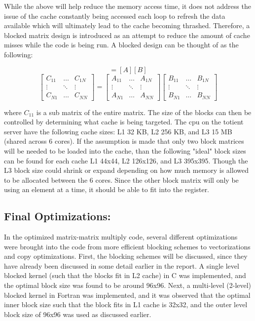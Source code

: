 \documentclass{article}
\begin{document}
While the above will help reduce the memory access time, it does not address the issue of the cache constantly being accessed each loop to refresh the data available which will ultimately lead to the cache becoming thrashed. Therefore, a blocked matrix design is introduced as an attempt to reduce the amount of cache misses while the code is being run. A blocked design can be thought of as the following:

\begin{equation*}
 [C] = [A][B]
 \end{equation*}
 \begin{equation*}
\begin{bmatrix}
C_{11} & \hdots & C_{1N} \\
\vdots & \ddots & \vdots \\
C_{N1} & \hdots & C_{NN}
\end{bmatrix} = \begin{bmatrix}
A_{11} & \hdots & A_{1N} \\
\vdots & \ddots & \vdots \\
A_{N1} & \hdots & A_{NN}
\end{bmatrix} \begin{bmatrix}
B_{11} & \hdots & B_{1N} \\
\vdots & \ddots & \vdots \\
B_{N1} & \hdots & B_{NN}
\end{bmatrix}
\end{equation*}

\noindent where $C_{11}$ is a sub matrix of the entire matrix. The size of the blocks can then be controlled by determining what cache is being targeted. The cpu on the totient server have the following cache sizes: L1 32 KB, L2 256 KB, and L3 15 MB (shared across 6 cores). If the assumption is made that only two block matrices will be needed to be loaded into the cache, than the following "ideal" block sizes can be found for each cache L1  44x44, L2 126x126, and L3 395x395. Though the L3 block size could shrink or expand depending on how much memory is allowed to be allocated between the 6 cores. Since the other block matrix will only be using an element at a time, it should be able to fit into the register.\\

\subsection*{Final Optimizations:}

In the optimized matrix-matrix multiply code, several different optimizations were brought into the code from more efficient blocking schemes to vectorizations and copy optimizations. First, the blocking schemes will be discussed, since they have already been discussed in some detail earlier in the report. A single level blocked kernel (such that the blocks fit in L2 cache) in C was implemented, and the optimal block size was found to be around 96x96. Next, a multi-level (2-level) blocked kernel in Fortran was implemented, and it was observed that the optimal inner block size such that the block fits in L1 cache is 32x32, and the outer level block size of 96x96 was used as discussed earlier. \\
\end{document}
